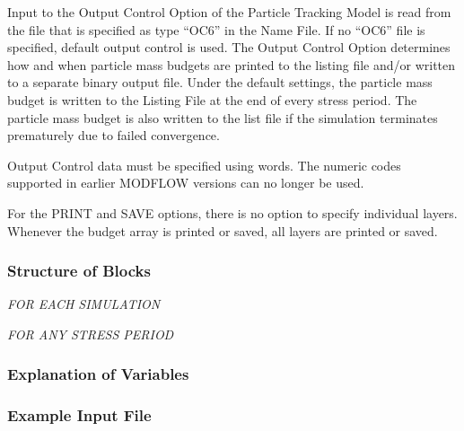 Input to the Output Control Option of the Particle Tracking Model is read from the file that is specified as type ``OC6'' in the Name File. If no ``OC6'' file is specified, default output control is used. The Output Control Option determines how and when particle mass budgets are printed to the listing file and/or written to a separate binary output file.  Under the default settings, the particle mass budget is written to the Listing File at the end of every stress period.  The particle mass budget is also written to the list file if the simulation terminates prematurely due to failed convergence.

Output Control data must be specified using words.  The numeric codes supported in earlier MODFLOW versions can no longer be used.

For the PRINT and SAVE options, there is no option to specify individual layers.  Whenever the budget array is printed or saved, all layers are printed or saved.

\vspace{5mm}
\subsubsection{Structure of Blocks}
\vspace{5mm}

\noindent \textit{FOR EACH SIMULATION}

\vspace{5mm}
\noindent \textit{FOR ANY STRESS PERIOD}


\vspace{5mm}
\subsubsection{Explanation of Variables}
\begin{description}

\end{description}

\vspace{5mm}
\subsubsection{Example Input File}

